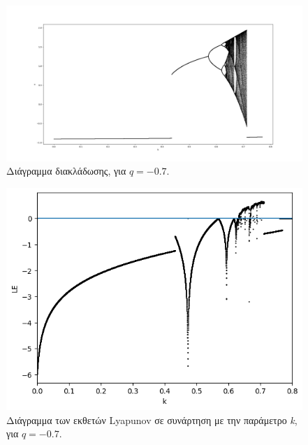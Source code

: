 \begin{figure}[h!]
	\centering
	\includegraphics[width=0.8\linewidth]{LateX images/graphs q09/g1}
	\caption{ Διάγραμμα διακλάδωσης, για $q=-0.7$.}
	\label{f:g14}
\end{figure}

\begin{figure}[h!]
	\centering
	\includegraphics[width=0.6\linewidth]{LateX images/graphs q09/g2}
	\caption{Διάγραμμα των εκθετών Lyapunov σε συνάρτηση με την παράμετρο \emph{k}, για $q=-0.7$.}
	\label{f:g15}
\end{figure}

